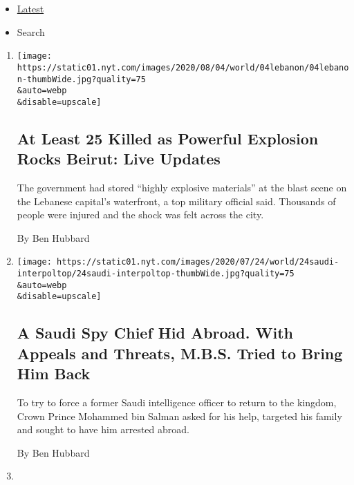 \begin{itemize}
\tightlist
\item
  \protect\hyperlink{stream-panel}{Latest}
\item
  Search
\end{itemize}

\begin{enumerate}
\def\labelenumi{\arabic{enumi}.}
\item
  \href{/2020/08/04/world/middleeast/beirut-explosion-blast.html}{}

  \texttt{[image: https://static01.nyt.com/images/2020/08/04/world/04lebanon/04lebanon-thumbWide.jpg?quality=75\\\&auto=webp\\\&disable=upscale]}

  \hypertarget{at-least-25-killed-as-powerful-explosion-rocks-beirut-live-updates}{%
  \subsection{At Least 25 Killed as Powerful Explosion Rocks Beirut:
  Live
  Updates}\label{at-least-25-killed-as-powerful-explosion-rocks-beirut-live-updates}}

  The government had stored ``highly explosive materials'' at the blast
  scene on the Lebanese capital's waterfront, a top military official
  said. Thousands of people were injured and the shock was felt across
  the city.

  By Ben Hubbard
\item
  \href{/2020/07/24/world/middleeast/Saudi-spy-mbs-extradition.html}{}

  \texttt{[image: https://static01.nyt.com/images/2020/07/24/world/24saudi-interpoltop/24saudi-interpoltop-thumbWide.jpg?quality=75\\\&auto=webp\\\&disable=upscale]}

  \hypertarget{a-saudi-spy-chief-hid-abroad-with-appeals-and-threats-mbs-tried-to-bring-him-back}{%
  \subsection{A Saudi Spy Chief Hid Abroad. With Appeals and Threats,
  M.B.S. Tried to Bring Him
  Back}\label{a-saudi-spy-chief-hid-abroad-with-appeals-and-threats-mbs-tried-to-bring-him-back}}

  To try to force a former Saudi intelligence officer to return to the
  kingdom, Crown Prince Mohammed bin Salman asked for his help, targeted
  his family and sought to have him arrested abroad.

  By Ben Hubbard
\item
  \href{/2020/07/12/world/middleeast/beirut-lebanon-economic-crisis.html}{}


\end{enumerate}
